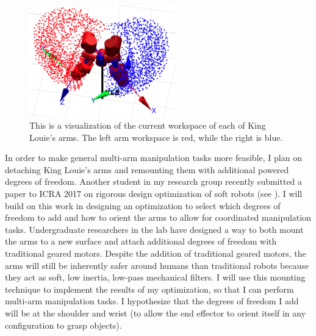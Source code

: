 \documentclass[12pt, letterpaper]{article}
\begin{document}
\begin{figure}
   \centering
   \includegraphics[trim = 0cm 0cm 0cm 0cm,clip,width=2.5in]{KLWorkspace.png}
   \caption{This is a visualization of the current workspace of each of King Louie's arms. The left arm workspace is red, while the right is blue.}
   \label{fig:kl_workspace}
\end{figure}

In order to make general multi-arm manipulation tasks more feasible, I plan on detaching King Louie's arms and remounting them with additional powered degrees of freedom. Another student in my research group recently submitted a paper to ICRA 2017 on rigorous design optimization of soft robots (see \cite{Bodily2017}). I will build on this work in designing an optimization to select which degrees of freedom to add and how to orient the arms to allow for coordinated manipulation tasks. Undergraduate researchers in the lab have designed a way to both mount the arms to a new surface and attach additional degrees of freedom with traditional geared motors. Despite the addition of traditional geared motors, the arms will still be inherently safer around humans than traditional robots because they act as soft, low inertia, low-pass mechanical filters. I will use this mounting technique to implement the results of my optimization, so that I can perform multi-arm manipulation tasks. I hypothesize that the degrees of freedom I add will be at the shoulder and wrist (to allow the end effector to orient itself in any configuration to grasp objects).
	
\end{document}

